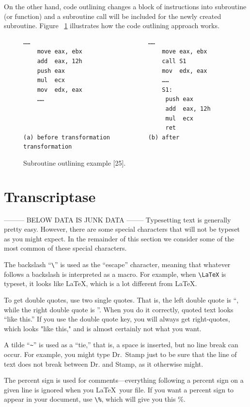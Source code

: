 On the other hand, code outlining changes a block of instructions into subroutine (or function) and a subroutine call will be included for the newly created subroutine. Figure ~\ref{fig:subroutineoutline} illustrates how the code outlining approach works.
\begin{figure}
  \centering
  \begin{lstlisting}[language=myasm]
	……									……
	move eax, ebx						move eax, ebx
	add  eax, 12h						call S1
	push eax							mov  edx, eax
	mul  ecx							……
	mov  edx, eax						S1: 
	…… 							 		 push eax
										 add  eax, 12h
										 mul  ecx
										 ret
(a) before transformation			(b) after transformation
\end{lstlisting}


    \caption[Subroutine outlining example]{Subroutine outlining example [25].}
    \label{fig:subroutineoutline}
\end{figure}

\section{Transcriptase}
--------- BELOW DATA IS JUNK DATA --------
Typesetting text is generally pretty easy. However, there are some special
characters that will not be typeset as you might expect. In the remainder of this
section we consider some of the most common of these
special characters. 

The backslash ``\verb+\+'' is used 
as the ``escape'' character, meaning that
whatever follows a backslash is interpreted as a macro.
For example, when \verb+\LaTeX+ is typeset, it looks like \LaTeX, which 
is a lot different from LaTeX.

To get double quotes, use two single quotes. That is, the left double quote is ``, while the right double
quote is ''. When you do it correctly, quoted text looks ``like this.''
If you use the double quote key, you will always get right-quotes, which looks "like this," and is
almost certainly not what you want.

A tilde ``\verb+~+'' is used as a ``tie,'' that is, a space is inserted, but no line break can occur.
For example, you might type Dr.~Stamp just to be sure that the line of text
does not break between Dr. and Stamp, as it otherwise might.

The percent sign is used for comments---everything following a percent sign 
on a given line is ignored when you \LaTeX\ your file. %
If you want a percent sign to appear in your document, use \verb+\%+, 
which will give you this \%.

